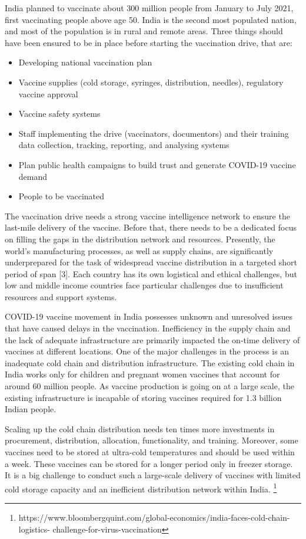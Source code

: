 \documentclass{article}
\begin{document}
India planned to vaccinate about 300 million people from January to July 2021, first vaccinating people above age 50. India is the second most populated nation, and most of the population is in rural and remote areas. Three things should have been ensured to be in place before starting the vaccination drive, that are:

\begin{itemize}
\item Developing national vaccination plan 
\item Vaccine supplies (cold storage, syringes, distribution, needles), regulatory vaccine approval
\item Vaccine safety systems
\item Staff implementing the drive (vaccinators, documentors) and their training
\Strengthening data collection, tracking, reporting, and analysing systems
\item Plan public health campaigns to build trust and generate COVID-19 vaccine demand
\item People to be vaccinated
\end{itemize}

The vaccination drive needs a strong vaccine intelligence network to ensure the last-mile delivery of the vaccine. Before that, there needs to be a dedicated focus on filling the gaps in the distribution network and resources. Presently, the world’s manufacturing processes, as well as supply chains, are significantly underprepared for the task of widespread vaccine distribution in a targeted short period of span [3]. Each country has its own logistical and ethical challenges, but low and middle income countries face particular challenges due to insufficient resources and support systems.  

COVID-19 vaccine movement in India possesses unknown and unresolved issues that have caused delays in the vaccination. Inefficiency in the supply chain and the lack of adequate infrastructure are primarily impacted the on-time delivery of vaccines at different locations. One of the major challenges in the process is an inadequate cold chain and distribution infrastructure. The existing cold chain in India works only for children and pregnant women vaccines that account for around 60 million people. As vaccine production is going on at a large scale, the existing infrastructure is incapable of storing vaccines required for 1.3 billion Indian people.  

Scaling up the cold chain distribution needs ten times more investments in procurement, distribution, allocation, functionality, and training. Moreover, some vaccines need to be stored at ultra-cold temperatures and should be used within a week. These vaccines can be stored for a longer period only in freezer storage. It is a big challenge to conduct such a large-scale delivery of vaccines with limited cold storage capacity and an inefficient distribution network within India. \footnote {https://www.bloombergquint.com/global-economics/india-faces-cold-chain-logistics- challenge-for-virus-vaccination}          
\end{document}
